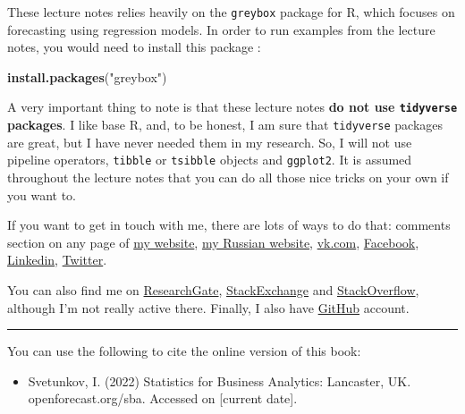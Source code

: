 \documentclass[
]{book}
\newenvironment{Shaded}{\begin{snugshade}}{\end{snugshade}}
\newcommand{\FunctionTok}[1]{\textcolor[rgb]{0.13,0.29,0.53}{\textbf{#1}}}
\newcommand{\NormalTok}[1]{#1}
\newcommand{\StringTok}[1]{\textcolor[rgb]{0.31,0.60,0.02}{#1}}
\providecommand{\tightlist}{%
  \setlength{\itemsep}{0pt}\setlength{\parskip}{0pt}}
\theoremstyle{definition}
\theoremstyle{definition}
\theoremstyle{definition}
\theoremstyle{definition}
\theoremstyle{remark}
\begin{document}
These lecture notes relies heavily on the \texttt{greybox} package for R, which focuses on forecasting using regression models. In order to run examples from the lecture notes, you would need to install this package \citep{R-greybox}:

\begin{Shaded}
\begin{Highlighting}[]
\FunctionTok{install.packages}\NormalTok{(}\StringTok{"greybox"}\NormalTok{)}
\end{Highlighting}
\end{Shaded}

A very important thing to note is that these lecture notes \textbf{do not use \texttt{tidyverse} packages}. I like base R, and, to be honest, I am sure that \texttt{tidyverse} packages are great, but I have never needed them in my research. So, I will not use pipeline operators, \texttt{tibble} or \texttt{tsibble} objects and \texttt{ggplot2}. It is assumed throughout the lecture notes that you can do all those nice tricks on your own if you want to.

If you want to get in touch with me, there are lots of ways to do that: comments section on any page of \href{https://forecasting.svetunkov.ru/}{my website}, \href{https://ivan.svetunkov.ru/}{my Russian website}, \href{https://vk.com/isvetunkov}{vk.com}, \href{https://www.facebook.com/isvetunkov}{Facebook}, \href{https://www.linkedin.com/in/isvetunkov}{Linkedin}, \href{https://twitter.com/iSvetunkov}{Twitter}.

You can also find me on \href{https://www.researchgate.net/profile/Ivan_Svetunkov}{ResearchGate}, \href{http://stats.stackexchange.com/users/87585/ivan-svetunkov}{StackExchange} and \href{http://stackoverflow.com/users/5296618/ivan-svetunkov}{StackOverflow}, although I'm not really active there. Finally, I also have \href{https://github.com/config-i1}{GitHub} account.

\begin{center}\rule{0.5\linewidth}{0.5pt}\end{center}

You can use the following to cite the online version of this book:

\begin{itemize}
\tightlist
\item
  Svetunkov, I. (2022) Statistics for Business Analytics: Lancaster, UK. openforecast.org/sba. Accessed on {[}current date{]}.
\end{itemize}
\end{document}

